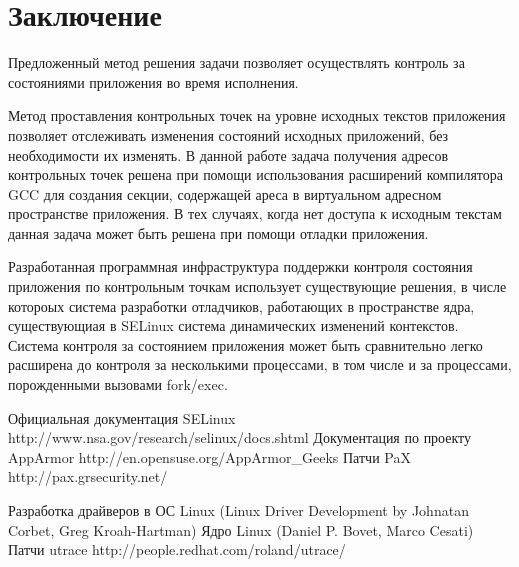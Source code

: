 
\bigskip
\section {Заключение} 

Предложенный метод решения задачи 
позволяет осуществлять контроль за 
состояниями приложения во время исполнения.

Метод проставления контрольных точек
на уровне исходных текстов приложения позволяет 
отслеживать изменения состояний исходных 
приложений, без необходимости их изменять. 
В данной работе задача получения 
адресов контрольных точек решена при помощи 
использования расширений компилятора GCC 
для создания секции, содержащей ареса в 
виртуальном адресном пространстве приложения.
В тех случаях, когда нет доступа к исходным 
текстам данная задача может быть решена при 
помощи отладки приложения. 

Разработанная программная инфраструктура 
поддержки контроля состояния приложения 
по контрольным точкам использует 
существующие решения, в числе котороых система 
разработки отладчиков, работающих в пространстве 
ядра, существующиая в SELinux система динамических 
изменений контекстов. Система контроля за 
состоянием приложения может быть сравнительно 
легко расширена до контроля за несколькими процессами, 
в том числе и за процессами, порожденными вызовами 
fork/exec. 


\bigskip
\begin{thebibliography}{99}
Официальная документация SELinux 
http://www.nsa.gov/research/selinux/docs.shtml
Документация по проекту AppArmor 
http://en.opensuse.org/AppArmor\_Geeks
Патчи PaX http://pax.grsecurity.net/

Разработка драйверов в ОС Linux 
(Linux Driver Development by Johnatan Corbet, 
Greg Kroah-Hartman)
Ядро Linux (Daniel P. Bovet, Marco Cesati) 
Патчи utrace http://people.redhat.com/roland/utrace/

\end{thebibliography}
